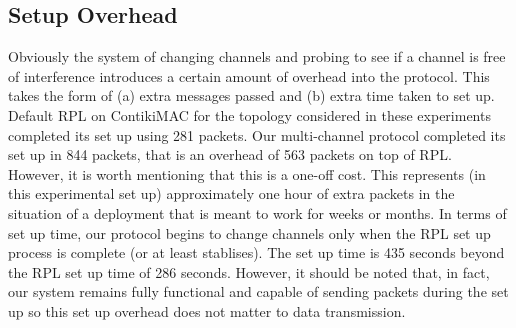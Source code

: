 \subsection{Setup Overhead}




Obviously the system of changing channels and probing to see if a channel is free of interference introduces a certain amount of overhead into
the protocol.  This takes the form of (a) extra messages passed and (b) extra time taken to set up.  Default RPL on ContikiMAC for the topology considered in these experiments completed its set up using 281 packets.  Our multi-channel protocol completed its set up in 844 packets, that is an overhead of 563 packets on top of RPL. However, it is worth mentioning that this is a one-off cost.  This represents (in this experimental set up) approximately one hour of extra packets in the situation of a deployment that is meant to work for weeks or months.  In terms of set up time, our protocol begins to change channels only when the RPL set up process is complete (or at least stablises).  The set up time is 435 seconds beyond the 
RPL set up time of 286 seconds.  However, it should be noted that, in fact, our system remains fully functional and capable of sending packets during
the set up so this set up overhead does not matter to data transmission.
